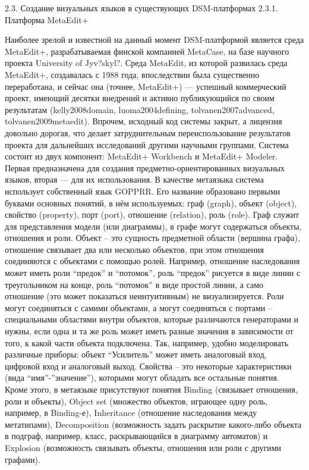 2.3. Создание визуальных языков в существующих DSM-платформах
2.3.1. Платформа MetaEdit+

Наиболее зрелой и известной на данный момент DSM-платформой является среда MetaEdit+, разрабатываемая финской компанией MetaCase, на базе научного проекта University of Jyv?skyl?. Среда MetaEdit, из которой развилась среда MetaEdit+, создавалась с 1988 года, впоследствии была существенно переработана, и сейчас она (точнее, MetaEdit+) --- успешный коммерческий проект, имеющий десятки внедрений и активно публикующийся по своим результатам (kelly2008domain, luoma2004defining, tolvanen2007advanced, tolvanen2009metaedit). Впрочем, исходный код системы закрыт, а лицензия довольно дорогая, что делает затруднительным переиспользование результатов проекта для дальнейших исследований другими научными группами.
	Система состоит из двух компонент: MetaEdit+ Workbench и MetaEdit+ Modeler. Первая предназначена для создания предметно-ориентированных визуальных языков, вторая --- для их использования. В качестве метаязыка система использует собственный язык GOPPRR. Его название образовано первыми буквами основных понятий, в нём используемых: граф (graph), объект (object), свойство (property), порт (port), отношение (relation), роль (role). Граф служит для представления модели (или диаграммы), в графе могут содержаться объекты, отношения и роли. Объект – это сущность предметной области (вершина графа), отношение связывает два или несколько объектов, при этом отношения соединяются с объектами с помощью ролей. Например, отношение наследования может иметь роли “предок” и “потомок”, роль “предок” рисуется в виде линии с треугольником на конце, роль “потомок” в виде простой линии, а само отношение (это может показаться неинтуитивным) не визуализируется. Роли могут соединяться с самими объектами, а могут соединяться с портами – специальными областями внутри объектов, которые различаются генераторами и нужны, если одна и та же роль может иметь разные значения в зависимости от того, к какой части объекта подключена. Так, например, удобно моделировать различные приборы: объект “Усилитель” может иметь аналоговый вход, цифровой вход и аналоговый выход. Свойства – это некоторые характеристики (вида “имя”-”значение”), которыми могут обладать все остальные понятия. Кроме этого, в метаязыке присутствуют понятия Binding (связывает отношения, роли и объекты), Object set (множество объектов, играющее одну роль, например, в Binding-е), Inheritance (отношение наследования между метатипами), Decomposition (возможность задать раскрытие какого-либо объекта в подграф, например, класс, раскрывающийся в диаграмму автоматов) и Explosion (возможность связывать объекты, отношения или роли с другими графами).
